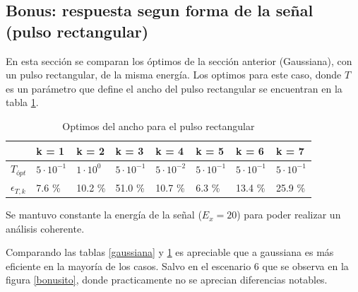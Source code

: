 \documentclass[letterpaper,11pt]{article}
\begin{document}
\subsection{Bonus: respuesta segun forma de la señal (pulso rectangular)}

En esta sección se comparan los óptimos de la sección anterior (Gaussiana), con un pulso rectangular, de la misma energía. Los optimos para este caso, donde $T$ es un parámetro que define el ancho del pulso rectangular se encuentran en la tabla \ref{pulso}.


\begin{table}[H]
\centering
\caption{Optimos del ancho para el pulso rectangular}
\label{pulso}
\begin{tabular}{l|l|l|l|l|l|l|l|}
\cline{2-8}
                                                               & \cellcolor[HTML]{C0C0C0}k = 1 & \cellcolor[HTML]{C0C0C0}k = 2 & \cellcolor[HTML]{C0C0C0}k = 3 & \cellcolor[HTML]{C0C0C0}k = 4 & \cellcolor[HTML]{C0C0C0}k = 5 & \cellcolor[HTML]{C0C0C0}k = 6 & \cellcolor[HTML]{C0C0C0}k = 7 \\ \hline
\multicolumn{1}{|l|}{\cellcolor[HTML]{C0C0C0}$T_{ópt}$}        & $5\cdot 10^{-1}$              & $1\cdot 10^{0}$               & $5\cdot 10^{-1}$              & $5\cdot 10^{-2}$              & $5\cdot 10^{-1}$              & $5\cdot 10^{-1}$              & $5\cdot 10^{-1}$              \\ \hline
\multicolumn{1}{|l|}{\cellcolor[HTML]{C0C0C0}$\epsilon_{T,k}$} & 7.6 \%                        & 10.2 \%                       & 51.0 \%                       & 10.7 \%                       & 6.3 \%                        & 13.4 \%                       & 25.9 \%                       \\ \hline
\end{tabular}
\end{table}

Se mantuvo constante la energía de la señal ($E_{x} =  20$) para poder realizar un análisis coherente.

Comparando las tablas \ref{gaussiana} y \ref{pulso} es apreciable que a gaussiana es más eficiente en la mayoría de los casos. Salvo en el escenario 6 que se observa en la figura \ref{bonusito}, donde practicamente no se aprecian diferencias notables.
\end{document}
